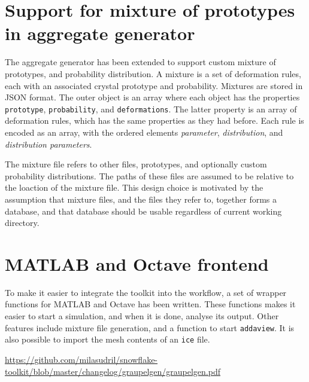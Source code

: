 \documentclass[a4paper,10pt]{scrartcl}
\begin{document}
\section{Support for mixture of prototypes in aggregate generator}
The aggregate generator has been extended to support custom mixture of prototypes, and probability distribution. A mixture is a set of deformation rules, each with an associated crystal prototype and probability. Mixtures are stored in JSON format. The outer object is an array where each object has the properties \texttt{prototype}, \texttt{probability}, and \texttt{deformations}. The latter property is an array of deformation rules, which has the same properties as they had before. Each rule is encoded as an array, with the ordered elements \textit{parameter}, \textit{distribution}, and \textit{distribution parameters}.

The mixture file refers to other files, prototypes, and optionally custom probability distributions. The paths of these files are assumed to be relative to the loaction of the mixture file. This design choice is motivated by the assumption that mixture files, and the files they refer to, together forms a database, and that database should be usable regardless of current working directory.

\section{MATLAB and Octave frontend}
To make it easier to integrate the toolkit into the workflow, a set of wrapper functions for MATLAB and Octave has been written. These functions makes it easier to start a simulation, and when it is done, analyse its output. Other features include mixture file generation, and a function to start \texttt{addaview}. It is also possible to import the mesh contents of an \texttt{ice} file.

\begin{thebibliography}{9}
 \url{https://github.com/milasudril/snowflake-toolkit/blob/master/changelog/graupelgen/graupelgen.pdf}
\end{thebibliography}
\vfill
\end{document}
